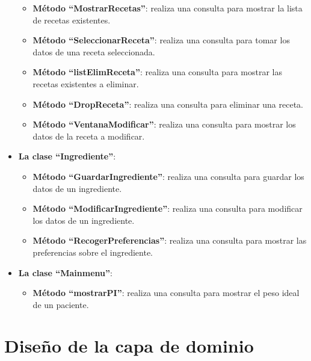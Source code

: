 \begin{itemize}
\begin{itemize}
\item \textbf{Método ``MostrarRecetas''}: realiza una consulta para mostrar la lista de recetas existentes.
\item \textbf{Método ``SeleccionarReceta''}: realiza una consulta para tomar los datos de una receta seleccionada.
\item \textbf{Método ``listElimReceta''}: realiza una consulta para mostrar las recetas existentes a eliminar.
\item \textbf{Método ``DropReceta''}: realiza una consulta para eliminar una receta.
\item \textbf{Método ``VentanaModificar''}: realiza una consulta para mostrar los datos de la receta a modificar.
\end{itemize}
\item \textbf{La clase ``Ingrediente''}:
\begin{itemize}
\item \textbf{Método ``GuardarIngrediente''}: realiza una consulta para guardar los datos de un ingrediente.
\item \textbf{Método ``ModificarIngrediente''}: realiza una consulta para modificar los datos de un ingrediente.
\item \textbf{Método ``RecogerPreferencias''}: realiza una consulta para mostrar las preferencias sobre el ingrediente.
\end{itemize}
\item \textbf{La clase ``Mainmenu''}:
\begin{itemize}
\item \textbf{Método ``mostrarPI''}: realiza una consulta para mostrar el peso ideal de un paciente.
\end{itemize}
\end{itemize}


\section{Diseño de la capa de dominio}
